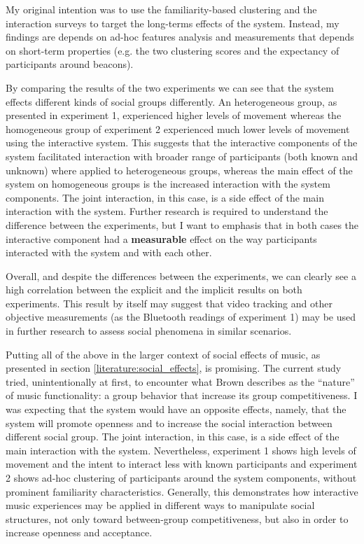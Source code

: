 \documentclass[a4paper,11pt]{article}
\begin{document}
{My original intention was to use the familiarity-based clustering and the interaction surveys to target the long-terms effects of the system.
Instead, my findings are depends on ad-hoc features analysis and measurements that depends on short-term properties (e.g. the two clustering scores and the expectancy of participants around beacons).

By comparing the results of the two experiments we can see that the system effects different kinds of social groups differently.
An heterogeneous group, as presented in experiment 1, experienced higher levels of movement whereas the homogeneous group of experiment 2 experienced much lower levels of movement using the interactive system.
This suggests that the interactive components of the system facilitated interaction with broader range of participants (both known and unknown) where applied to heterogeneous groups, whereas the main effect of the system on homogeneous groups is the increased interaction with the system components.
The joint interaction, in this case, is a side effect of the main interaction with the system.
Further research is required to understand the difference between the experiments, but I want to emphasis that in both cases the interactive component had a \textbf{measurable} effect on the way participants interacted with the system and with each other.

Overall, and despite the differences between the experiments, we can clearly see a high correlation between the explicit and the implicit results on both experiments.
This result by itself may suggest that video tracking and other objective measurements (as the Bluetooth readings of experiment 1) may be used in further research to assess social phenomena in similar scenarios.

Putting all of the above in the larger context of social effects of music, as presented in section \ref{literature:social_effects}, is promising.
The current study tried, unintentionally at first, to encounter what Brown describes as the ``nature'' of music functionality: a group behavior that increase its group competitiveness.
I was expecting that the system would have an opposite effects, namely, that the system will promote openness and to increase the social interaction between different social group.
The joint interaction, in this case, is a side effect of the main interaction with the system.
Nevertheless, experiment 1 shows high levels of movement and the intent to interact less with known participants and experiment 2 shows ad-hoc clustering of participants around the system components, without prominent familiarity characteristics.
Generally, this demonstrates how interactive music experiences may be applied in different ways to manipulate social structures, not only toward between-group competitiveness, but also in order to increase openness and acceptance.

}
\end{document}
